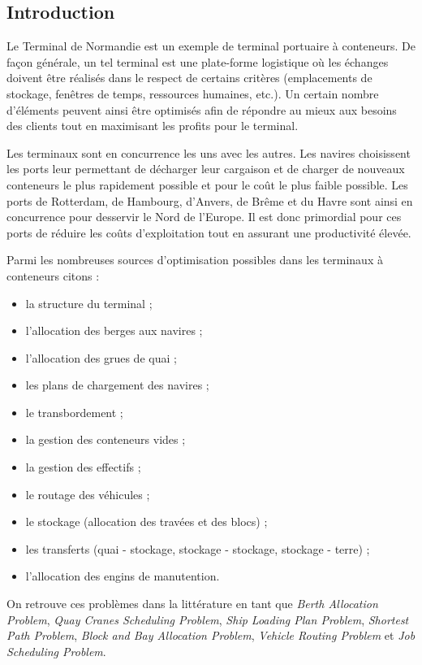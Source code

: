 
\subsection*{Introduction}

Le Terminal de Normandie est un exemple de terminal portuaire à conteneurs. 
De façon générale, un tel terminal est une plate-forme logistique où les échanges doivent être réalisés dans le respect de certains critères (emplacements de stockage, fenêtres de temps, ressources humaines, etc.). 
Un certain nombre d'éléments peuvent ainsi être optimisés afin de répondre au mieux aux besoins des clients tout en maximisant les profits pour le terminal.

Les terminaux sont en concurrence les uns avec les autres. Les navires choisissent les ports leur permettant de décharger leur cargaison et de charger de nouveaux conteneurs le plus rapidement possible et pour le coût le plus faible possible. Les ports de Rotterdam, de Hambourg, d'Anvers, de Brême et du Havre sont ainsi en concurrence pour desservir le Nord de l'Europe. 
Il est donc primordial pour ces ports de réduire les coûts d'exploitation tout en assurant une productivité élevée.

Parmi les nombreuses sources d'optimisation possibles dans les terminaux à conteneurs citons : 
\begin{itemize}
  \item la structure du terminal ;
  \item l'allocation des berges aux navires ;
  \item l'allocation des grues de quai ;
  \item les plans de chargement des navires ;
  \item le transbordement ;
  \item la gestion des conteneurs vides ;
  \item la gestion des effectifs ;
  \item le routage des véhicules ;
  \item le stockage (allocation des travées et des blocs) ;
  \item les transferts (quai - stockage, stockage - stockage, stockage - terre) ;
  \item l'allocation des engins de manutention.
\end{itemize}
On retrouve ces problèmes dans la littérature en tant que \textit{Berth Allocation Problem}, \textit{Quay Cranes Scheduling Problem}, \textit{Ship Loading Plan Problem}, \textit{Shortest Path Problem}, \textit{Block and Bay Allocation Problem}, \textit{Vehicle Routing Problem} et \textit{Job Scheduling Problem}. %

